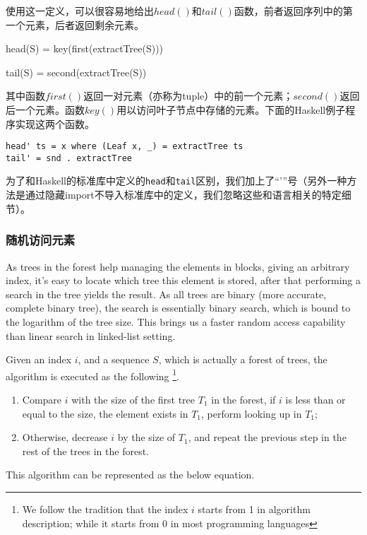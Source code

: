 \documentclass[UTF8]{article}
\begin{document}
使用这一定义，可以很容易地给出$head()$和$tail()$函数，前者返回序列中的第一个元素，后者返回剩余元素。

\be
head(S) = key(first(extractTree(S)))
\ee

\be
tail(S) = second(extractTree(S))
\ee

其中函数$first()$返回一对元素（亦称为tuple）中的前一个元素；$second()$返回后一个元素。函数$key()$用以访问叶子节点中存储的元素。下面的Haskell例子程序实现这两个函数。

\begin{lstlisting}
head' ts = x where (Leaf x, _) = extractTree ts
tail' = snd . extractTree
\end{lstlisting}

为了和Haskell的标准库中定义的\texttt{head}和\texttt{tail}区别，我们加上了“'”号（另外一种方法是通过隐藏import不导入标准库中的定义，我们忽略这些和语言相关的特定细节）。

\subsubsection{随机访问元素}

As trees in the forest help managing the elements in blocks, giving an arbitrary index,
it's easy to locate which tree this element is stored, after that performing a search
in the tree yields the result. As all trees are binary (more accurate, complete binary
tree), the search is essentially binary search, which is bound to the logarithm
of the tree size. This brings us a faster random access capability than linear search
in linked-list setting.

Given an index $i$, and a sequence $S$, which is actually a forest of trees, the
algorithm is executed as the following \footnote{We follow the
tradition that the index $i$ starts from 1 in algorithm description; while it starts from
0 in most programming languages}.

\begin{enumerate}
\item Compare $i$ with the size of the first tree $T_1$ in the forest, if $i$ is
less than or equal to the size, the element exists in $T_1$, perform looking up in $T_1$;
\item Otherwise, decrease $i$ by the size of $T_1$, and repeat the previous step
in the rest of the trees in the forest.
\end{enumerate}

This algorithm can be represented as the below equation.
\end{document}
